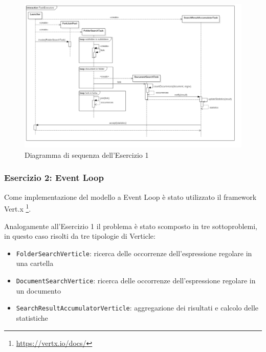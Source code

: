 \documentclass[a4paper]{article}
\begin{document}
\begin{figure}[H]

    \centering

    \includegraphics[width=\linewidth, height=\textheight,keepaspectratio]{TaskExecutors}

    \caption{Diagramma di sequenza dell'Esercizio 1}

    \label{fig:task-executors}

\end{figure}

\subsubsection{Esercizio 2: Event Loop}

Come implementazione del modello a Event Loop \`e stato utilizzato il framework Vert.x \footnote{\url{https://vertx.io/docs/}}.

Analogamente all'Esercizio 1 il problema \`e stato scomposto in tre sottoproblemi, in questo caso risolti da tre tipologie di Verticle:

\begin{itemize}

    \item \texttt{FolderSearchVerticle}: ricerca delle occorrenze dell'espressione regolare in una cartella

    \item \texttt{DocumentSearchVertice}: ricerca delle occorrenze dell'espressione regolare in un documento

    \item \texttt{SearchResultAccumulatorVerticle}: aggregazione dei risultati e calcolo delle statistiche

\end{itemize}
\end{document}
